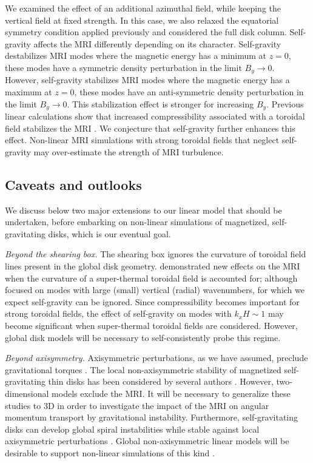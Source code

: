 We examined the effect of an additional azimuthal field, while
keeping the vertical field at fixed strength. In this case, we also
relaxed the equatorial symmetry condition applied previously and
considered the full disk column. Self-gravity affects the MRI
differently depending on its character. 
Self-gravity destabilizes MRI modes where the magnetic
energy has a minimum at $z=0$, these modes have a symmetric
density perturbation in the limit $B_y\to0$. However, 
self-gravity stabilizes MRI modes where the magnetic energy has a
maximum at $z=0$, these modes have an anti-symmetric density
perturbation in the limit $B_y\to0$. This stabilization effect is
stronger for increasing $B_y$. Previous linear calculations show that 
increased compressibility associated with a toroidal field stabilizes
the MRI \citep{kim03}. We conjecture that self-gravity 
further enhances this effect. Non-linear MRI simulations with strong
toroidal fields that neglect self-gravity may over-estimate the
strength of MRI turbulence.   



\subsection{Caveats and outlooks}
We discuss below two major extensions to our linear model that
should be undertaken, before embarking on non-linear simulations of
magnetized, self-gravitating disks, which is our eventual goal.  

\emph{Beyond the shearing box.} The shearing box ignores the curvature
of toroidal field lines present in the global disk 
geometry. \cite{pessah05} demonstrated new effects on the MRI 
when the curvature of a super-thermal toroidal field is accounted for;
although \citeauthor{pessah05} focused on modes with large (small)
vertical (radial) wavenumbers, for which we expect self-gravity
can be ignored. 
Since compressibility becomes important for strong
toroidal fields, the effect of self-gravity on modes with $k_xH\sim1$
may become significant when super-thermal toroidal fields are
considered. However, global disk models will be necessary
to self-consistently probe this regime. 


\emph{Beyond axisymmetry.} Axisymmetric perturbations, as we have
assumed, preclude gravitational torques \citep{lynden-bell72}. 
The local non-axisymmetric stability of magnetized self-gravitating
thin disks has been considered by several authors
\citep{elmegreen87,gammie96b,fan97,kim01}. However, two-dimensional models
exclude the MRI. It will be necessary to generalize these studies to
3D in order to investigate the impact of the MRI on angular momentum
transport by gravitational instability. Furthermore, self-gravitating
disks can develop global spiral instabilities while stable against local 
axisymmetric perturbations \citep{papaloizou89,papaloizou91}. Global
non-axisymmetric linear models will be desirable to support non-linear
simulations of this kind \citep{fromang04c,fromang05}.    

